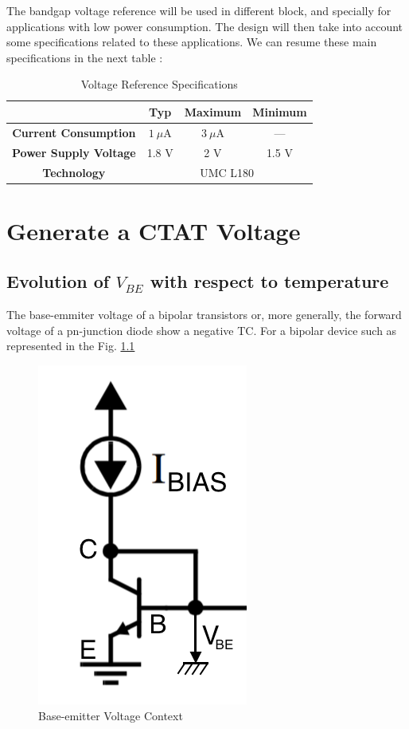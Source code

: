 \documentclass[11pt,a4paper]{report}
\begin{document}
The bandgap voltage reference will be used in different block, and specially for applications with low power consumption. The design will then take into account some specifications related to these applications. We can resume these main specifications in the next table :

\begin{table}[h]
  \begin{center}
  \begin{tabular}{|c|c|c|c|} \hline
                                 & Typ & Maximum       & Minimum \\ \hline
    \textbf{Current Consumption} & $1~\mu$A & $3~\mu$A &   ---     \\ \hline
    \textbf{Power Supply Voltage}& 1.8 V    & 2 V      & 1.5 V \\ \hline \hline
    \textbf{Technology}          & \multicolumn{3}{c|}{UMC L180}  \\ \hline
  \end{tabular}
\end{center}
\caption{Voltage Reference Specifications}
\end{table}


\chapter{Generate a CTAT Voltage}
\section{Evolution of $V_{BE}$ with respect to temperature}

The base-emmiter voltage of a bipolar transistors or, more generally, the forward voltage of a pn-junction diode show a negative TC. For a bipolar device such as represented in the Fig. \ref{vbe_T} 

\begin{figure}[h]
  \begin{center}
    \includegraphics[scale=0.3]{photo/CTAT_VBE}
  \end{center}
  \caption{Base-emitter Voltage Context}
  \label{vbe_T}
\end{figure}
\end{document}

